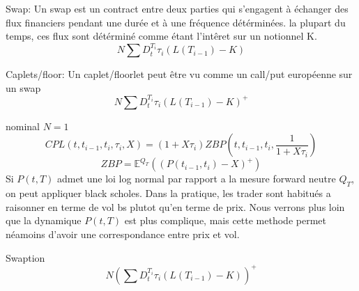 \begin{defn}
  Swap:
Un swap est un contract entre deux parties qui s'engagent à échanger des flux financiers pendant une durée et à une fréquence détérminées. la plupart du temps, ces flux sont détérminé comme étant l'intêret sur un notionnel K. 
$$ N \sum D_t^{T_i} \tau_i (L(T_{i-1}) - K) $$
\end{defn}


\begin{defn}
  Caplets/floor:
Un caplet/floorlet peut être vu comme un call/put européenne sur un swap
$$ N \sum D_t^{T_i} \tau_i (L(T_{i-1}) - K)^+ $$
\end{defn}

nominal $N = 1$
$$ CPL(t, t_{i-1}, t_i, \tau_i, X) = (1+X \tau_i) ZBP(t, t_{i-1}, t_i, \frac{1}{1+X \tau_i})$$
$$ZBP = \mathbb{E}^{Q_T}(  (P(t_{i-1}, t_i) - X)^+ )$$
Si $P(t, T)$ admet une loi log normal par rapport a la mesure forward neutre $Q_T$, on peut appliquer black scholes. Dans la pratique, les trader sont habitués a raisonner en terme de vol bs plutot qu'en terme de prix. Nous verrons plus loin que la dynamique $P(t, T)$ est plus complique, mais cette methode permet néamoins d'avoir une correspondance entre prix et vol.


\begin{defn}
Swaption
$$ N (\sum D_t^{T_i} \tau_i (L(T_{i-1}) - K))^+ $$
\end{defn}

